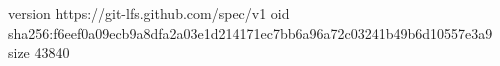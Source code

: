 version https://git-lfs.github.com/spec/v1
oid sha256:f6eef0a09ecb9a8dfa2a03e1d214171ec7bb6a96a72c03241b49b6d10557e3a9
size 43840
